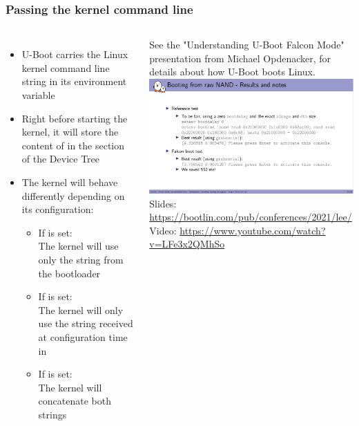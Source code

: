 \begin{frame}
  \frametitle{Passing the kernel command line}
  \begin{columns}
    \begin{itemize}
    \item U-Boot carries the Linux kernel command line string in its
       environment variable
    \item Right before starting the kernel, it will store the content of
       in the  section of the Device Tree
    \item The kernel will behave differently depending on its
      configuration:
      \begin{itemize}
      \item If  is set:\\
        The kernel will use only the string from the bootloader
      \item If  is set:\\
        The kernel will only use the string received at configuration
        time in 
      \item If  is set:\\
        The kernel will concatenate both strings
      \end{itemize}
    \end{itemize}
    \tiny See the "Understanding U-Boot Falcon Mode"
    presentation from Michael Opdenacker, for details about how U-Boot
    boots Linux.\\
    \vspace{0.6cm}
    \includegraphics[width=\textwidth]{slides/sysdev-kernel-booting/understanding-falcon-mode-presentation.png}\\
    \vspace{0.4cm}
    \tiny Slides: \url{https://bootlin.com/pub/conferences/2021/lee/}\\
    Video: \url{https://www.youtube.com/watch?v=LFe3x2QMhSo}
  \end{columns}
\end{frame}
